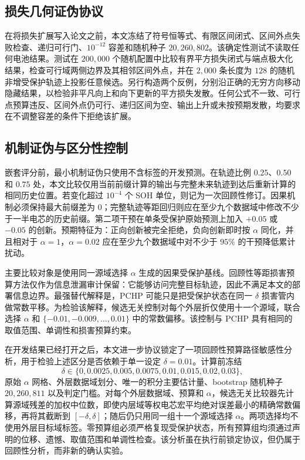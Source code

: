 \documentclass[UTF8,11pt]{ctexart}
\begin{document}
\subsection{损失几何证伪协议}

在将损失扩展写入论文之前，本文冻结了符号恒等式、有限区间闭式、区间外点失败检查、递归可行门、$10^{-12}$ 容差和随机种子 $20{,}260{,}802$。该确定性测试不读取任何电池结果。测试在 $200{,}000$ 个随机配置中比较有界平方损失闭式与端点极大化结果，检查可行域两侧边界及其相邻区间外点，并在 $2{,}000$ 条长度为 $128$ 的随机非增受保护轨迹上投影任意候选。另行构造两个反例，分别沿正确的无穷方向移动隐藏结果，以检验非平凡向上和向下更新的平方损失发散。任何公式不一致、可行点预算违反、区间外点仍可行、递归区间为空、输出上升或未按预期发散，均要求在不调整容差的条件下拒绝该扩展。

\subsection{机制证伪与区分性控制}

嵌套评分前，最小机制证伪只使用不含标签的开发预测。在轨迹比例 $0.25$、$0.50$ 和 $0.75$ 处，本文比较仅用当前前缀计算的输出与完整未来轨迹到达后重新计算的相同历史位置。若变化超过 $10^{-4}$ 个 SOH 单位，则记为一次回顾性修订。因果机制必须保持最大前缀差为 $0$；完整轨迹等距回归则应在至少九个数据域中修改不少于一半电芯的历史前缀。第二项干预在单条受保护原始预测上加入 $+0.05$ 或 $-0.05$ 的创新。预期特征为：正向创新被完全拒绝，负向创新即时按 $\alpha$ 同化，并且相对于 $\alpha=1$，$\alpha=0.02$ 应在至少九个数据域中对不少于 $95\%$ 的干预降低累计扰动。

主要比较对象是使用同一源域选择 $\alpha$ 生成的因果受保护基线。回顾性等距损害预算方法仅作为信息泄漏审计保留：它能够访问完整目标轨迹，因此不满足本文的部署信息边界。最强替代解释是，PCHP 可能只是把受保护状态在同一 $\delta$ 损害管内做常数平移。为检验该解释，候选无关控制对每个外层折仅使用十一个源域，联合选择 $\alpha$ 和 $\{-0.01,-0.009,\ldots,0.01\}$ 中的常数偏移。该控制与 PCHP 具有相同的取值范围、单调性和损害预算约束。

在开发结果已经打开之后，本文进一步协议锁定了一项回顾性预算路径敏感性分析，用于检验上述区分是否依赖于单一设定 $\delta=0.01$。计算前冻结
\[
\delta\in\{0,0.0025,0.005,0.0075,0.01,0.015,0.02,0.03\},
\]
原始 $\alpha$ 网格、外层数据域划分、唯一的积分主要估计量、bootstrap 随机种子 $20{,}260{,}811$ 以及判定门槛。对每个外层数据域、预算和 $\alpha$，候选无关比较器先计算源域残差的加权中位数，即使内层域等权电芯宏平均绝对误差最小的精确常数偏移，再将其截断到 $[-\delta,\delta]$；随后仍只用同一组十一个源域选择 $\alpha$。两项选择均不使用外层目标域标签。零预算组必须严格复现受保护状态，所有预算组均须通过声明的位移、遗憾、取值范围和单调性检查。该分析虽在执行前锁定协议，但仍属于回顾性分析，而非新的确认实验。
\end{document}

